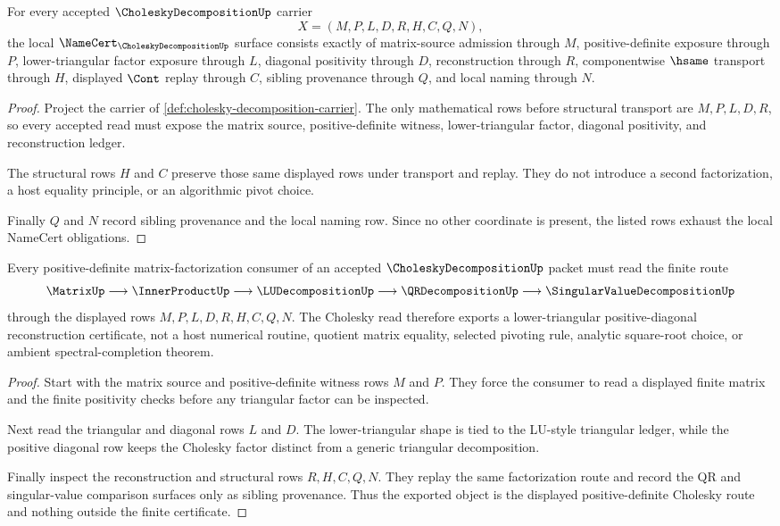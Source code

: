 \begin{theorem}
\label{thm:cholesky-decomposition-namecert-obligations}
For every accepted $\CholeskyDecompositionUp$ carrier
$$
X=(M,P,L,D,R,H,C,Q,N),
$$
the local $\NameCert_{\CholeskyDecompositionUp}$ surface consists exactly of matrix-source admission through $M$, positive-definite exposure through $P$, lower-triangular factor exposure through $L$, diagonal positivity through $D$, reconstruction through $R$, componentwise $\hsame$ transport through $H$, displayed $\Cont$ replay through $C$, sibling provenance through $Q$, and local naming through $N$.
\end{theorem}
\begin{proof}
Project the carrier of \autoref{def:cholesky-decomposition-carrier}. The only mathematical rows before structural transport are $M,P,L,D,R$, so every accepted read must expose the matrix source, positive-definite witness, lower-triangular factor, diagonal positivity, and reconstruction ledger.

The structural rows $H$ and $C$ preserve those same displayed rows under transport and replay. They do not introduce a second factorization, a host equality principle, or an algorithmic pivot choice.

Finally $Q$ and $N$ record sibling provenance and the local naming row. Since no other coordinate is present, the listed rows exhaust the local NameCert obligations.
\end{proof}

\begin{theorem}
\label{thm:cholesky-decomposition-positive-definite-route}
Every positive-definite matrix-factorization consumer of an accepted $\CholeskyDecompositionUp$ packet must read the finite route
$$
\MatrixUp \longrightarrow \InnerProductUp \longrightarrow \LUDecompositionUp \longrightarrow \QRDecompositionUp \longrightarrow \SingularValueDecompositionUp
$$
through the displayed rows $M,P,L,D,R,H,C,Q,N$. The Cholesky read therefore exports a lower-triangular positive-diagonal reconstruction certificate, not a host numerical routine, quotient matrix equality, selected pivoting rule, analytic square-root choice, or ambient spectral-completion theorem.
\end{theorem}
\begin{proof}
Start with the matrix source and positive-definite witness rows $M$ and $P$. They force the consumer to read a displayed finite matrix and the finite positivity checks before any triangular factor can be inspected.

Next read the triangular and diagonal rows $L$ and $D$. The lower-triangular shape is tied to the LU-style triangular ledger, while the positive diagonal row keeps the Cholesky factor distinct from a generic triangular decomposition.

Finally inspect the reconstruction and structural rows $R,H,C,Q,N$. They replay the same factorization route and record the QR and singular-value comparison surfaces only as sibling provenance. Thus the exported object is the displayed positive-definite Cholesky route and nothing outside the finite certificate.
\end{proof}

